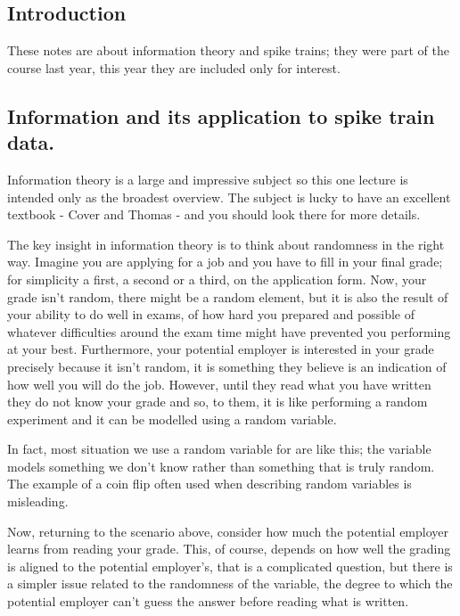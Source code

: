 \documentclass[11pt,a4paper]{scrartcl}
\begin{document}
\subsection*{Introduction}
These notes are about information theory and spike trains; they were
part of the course last year, this year they are included only for
interest.

\subsection*{Information and its application to spike train data.}

Information theory is a large and impressive subject so this one
lecture is intended only as the broadest overview. The subject is
lucky to have an excellent textbook - Cover and Thomas - and you
should look there for more details.

The key insight in information theory is to think about randomness in
the right way. Imagine you are applying for a job and you have to fill
in your final grade; for simplicity a first, a second or a third, on
the application form. Now, your grade isn't random, there might be a
random element, but it is also the result of your ability to do well
in exams, of how hard you prepared and possible of whatever
difficulties around the exam time might have prevented you performing
at your best. Furthermore, your potential employer is interested in
your grade precisely because it isn't random, it is something they
believe is an indication of how well you will do the job. However,
until they read what you have written they do not know your grade and
so, to them, it is like performing a random experiment and it can be
modelled using a random variable.

In fact, most situation we use a random variable for are like this;
the variable models something we don't know rather than something that
is truly random. The example of a coin flip often used when
describing random variables is misleading. 

Now, returning to the scenario above, consider how much the potential
employer learns from reading your grade. This, of course, depends on
how well the grading is aligned to the potential employer's, that is a
complicated question, but there is a simpler issue related to the
randomness of the variable, the degree to which the potential employer
can't guess the answer before reading what is written. 
\end{document}
